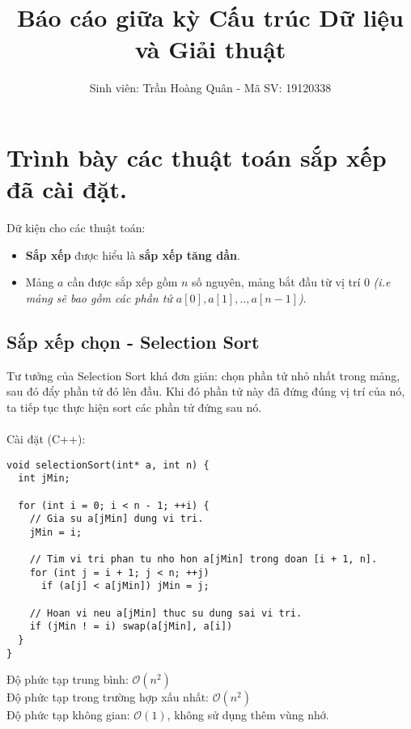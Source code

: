 \documentclass[]{article}
\title{Báo cáo giữa kỳ Cấu trúc Dữ liệu và Giải thuật}
\author{Sinh viên: Trần Hoàng Quân - Mã SV: 19120338}
\begin{document}
\maketitle
\tableofcontents
\pagebreak

\section{Trình bày các thuật toán sắp xếp đã cài đặt.}
Dữ kiện cho các thuật toán:
\begin{itemize}
\item \textbf{Sắp xếp} được hiểu là \textbf{sắp xếp tăng dần}.
\item Mảng $a$ cần được sắp xếp gồm $n$ số nguyên, mảng bắt đầu từ vị trí 0 \textit{(i.e mảng sẽ bao gồm các phần tử $a[0], a[1], .., a[n - 1]$)}.
\end{itemize}
\subsection{Sắp xếp chọn - Selection Sort}
Tư tưởng của Selection Sort khá đơn giản: chọn phần tử nhỏ nhất trong mảng, sau đó đẩy phần tử đó lên đầu. Khi đó phần tử này đã đứng đúng vị trí của nó, ta tiếp tục thực hiện sort các phần tử đứng sau nó.
\\\\
Cài đặt (C++):
\begin{lstlisting}
void selectionSort(int* a, int n) {
  int jMin;

  for (int i = 0; i < n - 1; ++i) {
    // Gia su a[jMin] dung vi tri.
    jMin = i;

    // Tim vi tri phan tu nho hon a[jMin] trong doan [i + 1, n].
    for (int j = i + 1; j < n; ++j)
      if (a[j] < a[jMin]) jMin = j;

    // Hoan vi neu a[jMin] thuc su dung sai vi tri.
    if (jMin ! = i) swap(a[jMin], a[i])
  }
}
\end{lstlisting}
Độ phức tạp trung bình: $\mathcal{O}(n^2)$
\\
Độ phức tạp trong trường hợp xấu nhất: $\mathcal{O}(n^2)$
\\
Độ phức tạp không gian: $\mathcal{O}(1)$, không sử dụng thêm vùng nhớ.
\end{document}
